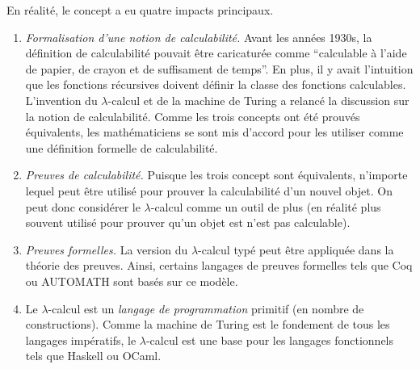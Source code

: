 En réalité, le concept a eu quatre impacts principaux.
\begin{enumerate}
	\item \emph{Formalisation d'une notion de calculabilité.} Avant les années 1930s, la définition de calculabilité pouvait être caricaturée comme ``calculable à l'aide de papier, de crayon et de suffisament de temps''. En plus, il y avait l'intuition que les fonctions récursives doivent définir la classe des fonctions calculables.
	L'invention du $\lambda$-calcul et de la machine de Turing a relancé la discussion sur la notion de calculabilité. Comme les trois concepts ont été prouvés équivalents, les mathématiciens se sont mis d'accord pour les utiliser comme une définition formelle de calculabilité.
	\item \emph{Preuves de calculabilité.} Puisque les trois concept sont équivalents, n'importe lequel peut être utilisé pour prouver la calculabilité d'un nouvel objet. On peut donc considérer le $\lambda$-calcul comme un outil de plus (en réalité plus souvent utilisé pour prouver qu'un objet est n'est pas calculable).
	\item \emph{Preuves formelles.}
	La version du $\lambda$-calcul typé peut être appliquée dans la théorie des preuves. Ainsi, certains langages de preuves formelles tels que Coq ou AUTOMATH sont basés sur ce modèle.
	
	\item Le $\lambda$-calcul est un \emph{langage de programmation} primitif (en nombre de constructions). Comme la machine de Turing est le fondement de tous les langages impératifs, le $\lambda$-calcul est une base pour les langages fonctionnels tels que Haskell ou OCaml.
\end{enumerate}

